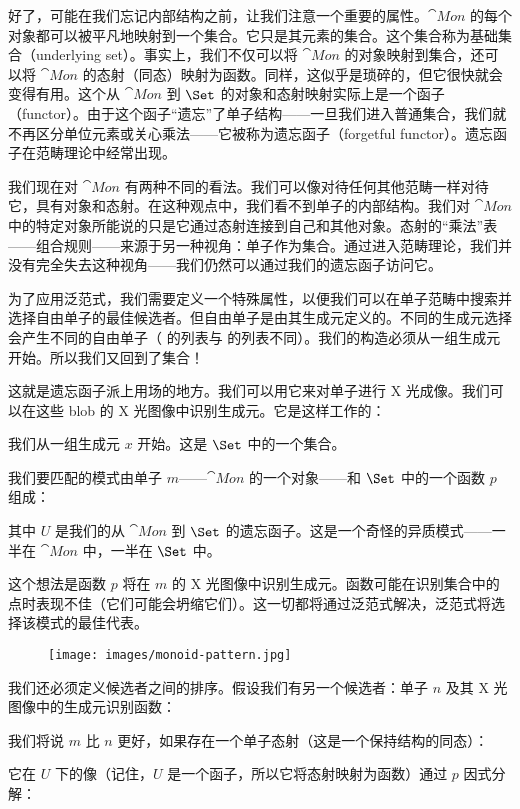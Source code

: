 好了，可能在我们忘记内部结构之前，让我们注意一个重要的属性。$\cat{Mon}$ 的每个对象都可以被平凡地映射到一个集合。它只是其元素的集合。这个集合称为基础集合（underlying set）。事实上，我们不仅可以将 $\cat{Mon}$ 的对象映射到集合，还可以将 $\cat{Mon}$ 的态射（同态）映射为函数。同样，这似乎是琐碎的，但它很快就会变得有用。这个从 $\cat{Mon}$ 到 $\Set$ 的对象和态射映射实际上是一个函子（functor）。由于这个函子“遗忘”了单子结构——一旦我们进入普通集合，我们就不再区分单位元素或关心乘法——它被称为遗忘函子（forgetful functor）。遗忘函子在范畴理论中经常出现。

我们现在对 $\cat{Mon}$ 有两种不同的看法。我们可以像对待任何其他范畴一样对待它，具有对象和态射。在这种观点中，我们看不到单子的内部结构。我们对 $\cat{Mon}$ 中的特定对象所能说的只是它通过态射连接到自己和其他对象。态射的“乘法”表——组合规则——来源于另一种视角：单子作为集合。通过进入范畴理论，我们并没有完全失去这种视角——我们仍然可以通过我们的遗忘函子访问它。

为了应用泛范式，我们需要定义一个特殊属性，以便我们可以在单子范畴中搜索并选择自由单子的最佳候选者。但自由单子是由其生成元定义的。不同的生成元选择会产生不同的自由单子（ 的列表与  的列表不同）。我们的构造必须从一组生成元开始。所以我们又回到了集合！

这就是遗忘函子派上用场的地方。我们可以用它来对单子进行 X 光成像。我们可以在这些 blob 的 X 光图像中识别生成元。它是这样工作的：

我们从一组生成元 $x$ 开始。这是 $\Set$ 中的一个集合。

我们要匹配的模式由单子 $m$——$\cat{Mon}$ 的一个对象——和 $\Set$ 中的一个函数 $p$ 组成：

其中 $U$ 是我们的从 $\cat{Mon}$ 到 $\Set$ 的遗忘函子。这是一个奇怪的异质模式——一半在 $\cat{Mon}$ 中，一半在 $\Set$ 中。

这个想法是函数 $p$ 将在 $m$ 的 X 光图像中识别生成元。函数可能在识别集合中的点时表现不佳（它们可能会坍缩它们）。这一切都将通过泛范式解决，泛范式将选择该模式的最佳代表。

\begin{figure}[H]
  \centering
  \texttt{[image: images/monoid-pattern.jpg]}
\end{figure}

\noindent
我们还必须定义候选者之间的排序。假设我们有另一个候选者：单子 $n$ 及其 X 光图像中的生成元识别函数：

我们将说 $m$ 比 $n$ 更好，如果存在一个单子态射（这是一个保持结构的同态）：

它在 $U$ 下的像（记住，$U$ 是一个函子，所以它将态射映射为函数）通过 $p$ 因式分解：

